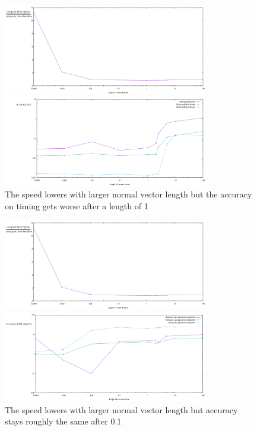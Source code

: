 \begin{figure}
	\centering
	\begin{minipage}{\textwidth}
		\includegraphics[width=0.8\textwidth]{figures/NormVsTime.pdf}
	\end{minipage}
	\begin{minipage}{\textwidth}
		\includegraphics[width=0.8\textwidth]{figures/NormVsSigmaTime.pdf}
	\end{minipage}
\caption{The speed lowers with larger normal vector length but the accuracy on timing gets worse after a length of 1}
\label{fig:norminfl}
\end{figure}
\begin{figure}
	\centering
	\begin{minipage}{\textwidth}
		\includegraphics[width=0.8\textwidth]{figures/NormVsTime.pdf}
	\end{minipage}
	\begin{minipage}{\textwidth}
		\includegraphics[width=0.8\textwidth]{figures/NormVsSigmaAZ.pdf}
	\end{minipage}
\caption{The speed lowers with larger normal vector length but accuracy stays roughly the same after 0.1}
\label{fig:norminfl2}
\end{figure}

